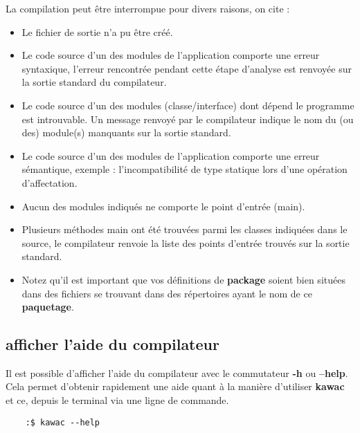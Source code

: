 \documentclass{../res/univ-projet}
\begin{document}
\begin{itemize}
      La compilation peut être interrompue pour divers raisons, on cite :
      \begin{itemize}
        \item Le fichier de sortie n’a pu être créé.
        \item Le code source d’un des modules de l’application
        comporte une erreur syntaxique, l’erreur rencontrée pendant cette
        étape d’analyse est renvoyée sur la sortie standard du compilateur.
        \item Le code source d’un des modules
        (classe/interface) dont dépend le programme est introuvable.
        Un message renvoyé par le compilateur indique le nom du (ou des)
        module(s) manquants sur la sortie standard.
        \item Le code source d’un des modules de l’application
        comporte une erreur sémantique, exemple : l’incompatibilité de type
        statique lors d’une opération d’affectation.
        \item Aucun des modules indiqués ne comporte le
        point d’entrée (main).
        \item Plusieurs méthodes main ont été trouvées parmi
        les classes indiquées dans le source, le compilateur renvoie la liste
        des points d’entrée trouvés sur la sortie standard.
        \item Notez qu'il est important que vos définitions de \textbf{package} soient bien situées
         dans des fichiers se trouvant dans des répertoires ayant le nom de ce \textbf{paquetage}.
      \end{itemize}

    \end{itemize}
  \subsection{afficher l'aide du compilateur}
    Il est possible d'afficher l'aide du compilateur avec le commutateur \textbf{-h} ou \textbf{--help}. Cela permet d'obtenir rapidement une aide quant à la manière d'utiliser \textbf{kawac} et ce, depuis le terminal via une ligne de commande.
  \begin{verbatim}
    :$ kawac --help
  \end{verbatim}

\newpage
\end{document}
